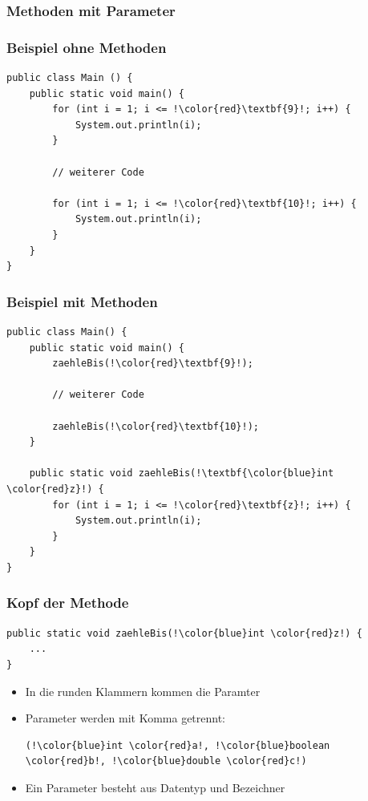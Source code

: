 \documentclass[final]{beamer}
\begin{document}
\subsubsection{Methoden mit Parameter}
\begin{frame}[containsverbatim]
	\frametitle{Beispiel ohne Methoden}
	\begin{lstlisting}[escapechar=!]
public class Main () {
	public static void main() {
		for (int i = 1; i <= !\color{red}\textbf{9}!; i++) {
			System.out.println(i);
		}
		
		// weiterer Code
		
		for (int i = 1; i <= !\color{red}\textbf{10}!; i++) {
			System.out.println(i);
		}
	}
}
	\end{lstlisting}
\end{frame}

\begin{frame}[containsverbatim]
	\frametitle{Beispiel mit Methoden}
	\begin{lstlisting}[escapechar=!]
public class Main() {
	public static void main() {
		zaehleBis(!\color{red}\textbf{9}!);
		
		// weiterer Code
		
		zaehleBis(!\color{red}\textbf{10}!);
	}

	public static void zaehleBis(!\textbf{\color{blue}int \color{red}z}!) {
		for (int i = 1; i <= !\color{red}\textbf{z}!; i++) {
			System.out.println(i);
		}
	}
}
	\end{lstlisting}
\end{frame}

\begin{frame}[containsverbatim]
	\frametitle{Kopf der Methode}
	\begin{lstlisting}[escapechar=!]
public static void zaehleBis(!\color{blue}int \color{red}z!) {
	...
}
	\end{lstlisting}
	\begin{itemize}
		\item{In die runden Klammern kommen die Paramter}
		\item{Parameter werden mit Komma getrennt:
			\begin{lstlisting}[escapechar=!]
(!\color{blue}int \color{red}a!, !\color{blue}boolean \color{red}b!, !\color{blue}double \color{red}c!)
			\end{lstlisting}
		}
		\item{Ein Parameter besteht aus {\color{blue}Datentyp} und \color{red}Bezeichner}
	\end{itemize}
\end{frame}
\end{document}
